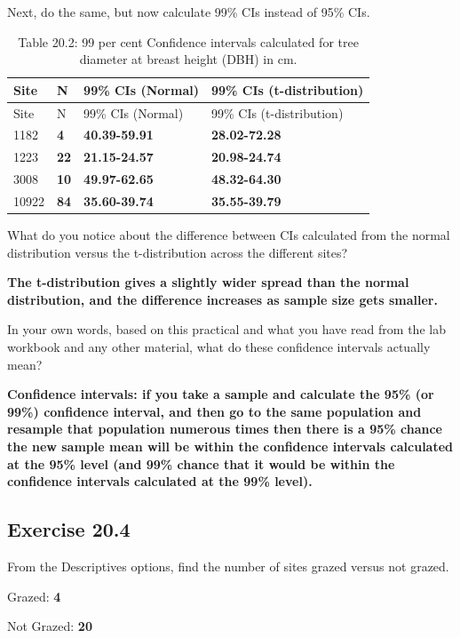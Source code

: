 \documentclass[
]{scrbook}
\begin{document}
Next, do the same, but now calculate 99\% CIs instead of 95\% CIs.

\begin{longtable}[]{@{}llll@{}}
\caption{Table 20.2: 99 per cent Confidence intervals calculated for tree diameter at breast height (DBH) in cm.}\tabularnewline
\toprule
Site & N & 99\% CIs (Normal) & 99\% CIs (t-distribution) \\
\midrule
\endfirsthead
\toprule
Site & N & 99\% CIs (Normal) & 99\% CIs (t-distribution) \\
\midrule
\endhead
1182 & \textbf{4} & \textbf{40.39-59.91} & \textbf{28.02-72.28} \\
1223 & \textbf{22} & \textbf{21.15-24.57} & \textbf{20.98-24.74} \\
3008 & \textbf{10} & \textbf{49.97-62.65} & \textbf{48.32-64.30} \\
10922 & \textbf{84} & \textbf{35.60-39.74} & \textbf{35.55-39.79} \\
\bottomrule
\end{longtable}

What do you notice about the difference between CIs calculated from the normal distribution versus the t-distribution across the different sites?

\textbf{The t-distribution gives a slightly wider spread than the normal distribution, and the difference increases as sample size gets smaller.}

In your own words, based on this practical and what you have read from the lab workbook and any other material, what do these confidence intervals actually mean?

\textbf{Confidence intervals: if you take a sample and calculate the 95\% (or 99\%) confidence interval, and then go to the same population and resample that population numerous times then there is a 95\% chance the new sample mean will be within the confidence intervals calculated at the 95\% level (and 99\% chance that it would be within the confidence intervals calculated at the 99\% level).}

\hypertarget{exercise-20.4}{%
\subsection{Exercise 20.4}\label{exercise-20.4}}

From the Descriptives options, find the number of sites grazed versus not grazed.

Grazed: \textbf{4}

Not Grazed: \textbf{20}
\end{document}
